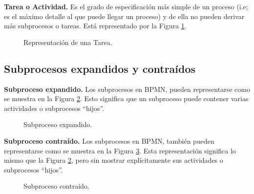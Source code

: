 {\bf Tarea o Actividad.} Es el grado de especificación más simple de un proceso (i.e; es el máximo detalle al que puede llegar un proceso) y de ella no pueden derivar más subprocesos o tareas. Está representado por la Figura \ref{Intro:iTarea}.
 	\begin{figure}[!h]
 	\centering{}%
 	\caption{Representación de una Tarea.}
 	\label{Intro:iTarea}
 	\end{figure}


\subsection{Subprocesos expandidos y contraídos}

{\bf Subproceso expandido.} Los subprocesos en BPMN, pueden representarse como se muestra en la Figura \ref{Intro:ExpandedSubprocess}. Esto significa que un subproceso puede contener varias actividades o subprocesos ``hijos''.
	\begin{figure}[!h]
	\centering{}%
	\caption{Subproceso expandido.}
	\label{Intro:ExpandedSubprocess}
	\end{figure}

{\bf Subproceso contraído.} Los subprocesos en BPMN, también pueden representarse como se muestra en la Figura \ref{Intro:CollapsedSubprocess}. Esta representación significa lo mismo que la Figura \ref{Intro:ExpandedSubprocess}, pero sin mostrar explícitamente sus actividades o subprocesos ``hijos''.
	\begin{figure}[!h]
	\centering{}%
	\caption{Subproceso contraído.}
	\label{Intro:CollapsedSubprocess}
	\end{figure}

